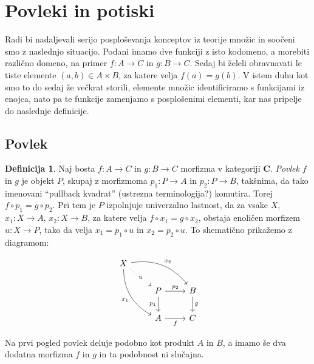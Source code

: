 \documentclass[12pt,a4paper]{book}
\theoremstyle{definition}
\newtheorem{definicija}{Definicija}[chapter]
\theoremstyle{plain}
\theoremstyle{definition}
\theoremstyle{remark}
\newcommand{\cat}[1]{\textbf{#1}}
\begin{document}
\section{Povleki in potiski}
Radi bi nadaljevali serijo posploševanja konceptov iz teorije množic in soočeni smo z naslednjo situacijo. Podani imamo dve funkciji z isto kodomeno, a morebiti različno domeno, na primer $f:A \to C$ in $g:B \to C$. Sedaj bi želeli obravnavati le tiste elemente $(a,b) \in A \times B$, za katere velja $f(a) = g(b)$. V istem duhu kot smo to do sedaj že večkrat storili, elemente množic identificiramo s funkcijami iz enojca, nato pa te funkcije zamenjamo s posplošenimi elementi, kar nas pripelje do naslednje definicije.

\subsection{Povlek}

\begin{definicija}
Naj bosta $f : A \to C$ in $g : B \to C$ morfizma v kategoriji $\cat{C}$. \emph{Povlek} $f$ in $g$ je objekt $P$, skupaj z morfizmoma $p_1 : P \to A$ in $p_2 : P \to B$, takšnima, da tako imenovani "`pullback kvadrat"' (ustrezna terminologija?) komutira. Torej $f \circ p_1 = g \circ p_2$. Pri tem je $P$ izpolnjuje univerzalno lastnost, da za vsake $X$, $x_1 : X \to A$, $x_2 : X \to B$, za katere velja $f \circ x_1 = g \circ x_2$, obstaja enoličen morfizem $u : X \to P$, tako da velja $x_1 = p_1 \circ u$ in $x_2 = p_2 \circ u$. To shematično prikažemo z diagramom:

$$\begin{tikzcd}
X
\arrow[drr, bend left, "x_2"]
\arrow[ddr, bend right, "x_1"']
\arrow[dr, dotted, "u" description] & & \\
& P \arrow[r, "p_2"] \arrow[d, "p_1"']
& B \arrow[d, "g"] \\
& A \arrow[r, "f"']
& C
\end{tikzcd}$$
\end{definicija}

Na prvi pogled povlek deluje podobno kot produkt $A$ in $B$, a imamo še dva dodatna morfizma $f$ in $g$ in ta podobnost ni slučajna.
\end{document}
